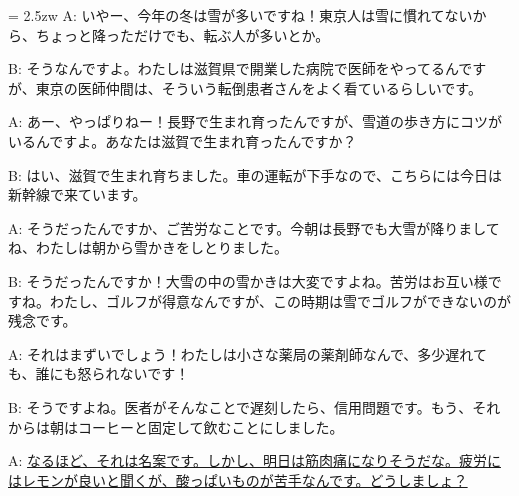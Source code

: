 \documentclass[11pt]{amsart}
\title{}
\author{}
\newenvironment{hangall}[1]{\hangindent = 2.5zw\everypar{\hangindent = 2.5zw}}{}
\begin{document}
\maketitle
\begin{hangall}{}%
A: いやー、今年の冬は雪が多いですね！東京人は雪に慣れてないから、ちょっと降っただけでも、転ぶ人が多いとか。

B: そうなんですよ。わたしは滋賀県で開業した病院で医師をやってるんですが、東京の医師仲間は、そういう転倒患者さんをよく看ているらしいです。

A: あー、やっぱりねー！長野で生まれ育ったんですが、雪道の歩き方にコツがいるんですよ。あなたは滋賀で生まれ育ったんですか？

B: はい、滋賀で生まれ育ちました。車の運転が下手なので、こちらには今日は新幹線で来ています。

A: そうだったんですか、ご苦労なことです。今朝は長野でも大雪が降りましてね、わたしは朝から雪かきをしとりました。

B: そうだったんですか！大雪の中の雪かきは大変ですよね。苦労はお互い様ですね。わたし、ゴルフが得意なんですが、この時期は雪でゴルフができないのが残念です。

A: それはまずいでしょう！わたしは小さな薬局の薬剤師なんで、多少遅れても、誰にも怒られないです！

B: そうですよね。医者がそんなことで遅刻したら、信用問題です。もう、それからは朝はコーヒーと固定して飲むことにしました。

A: \ul{なるほど、それは名案です。しかし、明日は筋肉痛になりそうだな。疲労にはレモンが良いと聞くが、酸っぱいものが苦手なんです。どうしましょ？}\end{hangall}
\end{document}
